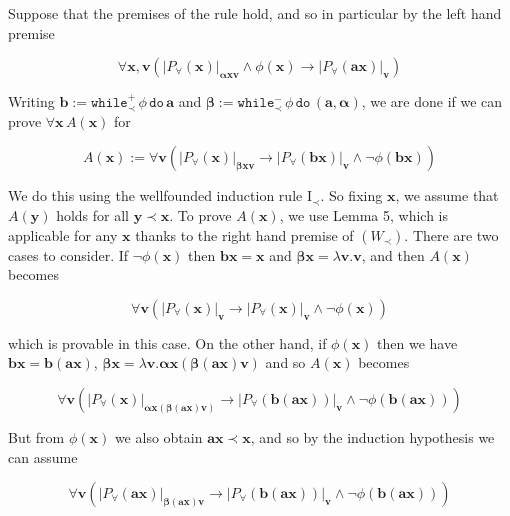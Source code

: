\documentclass[10pt,a4paper]{article}
\begin{document}
Suppose that the premises of the rule hold, and so in particular by the left hand premise\par
  
\par  \quad  \[\forall\bm{x},\bm{v}\left(|{P_{\forall}(\bm{x})}|_{\bm{\alpha}\bm{x}\bm{v}}\wedge\phi(\bm{x})\to|{P_{\forall}(\bm{a}\bm{x})}|_{\bm{v}}\right)\]\quad  \quad  
  
Writing $\bm{b}:=\mathtt{while}^{+}_{\prec}\,{\phi}\,\mathtt{do}\,{\bm{a}}$ and $\bm{\beta}:=\mathtt{while}^{-}_{\prec}\,{\phi}\,\mathtt{do}\,{(\bm{a},\bm{\alpha})}$, we are done if we can prove $\forall\bm{x}\,A(\bm{x})$ for\par
  
\par  \quad  \[A(\bm{x}):=\forall\bm{v}\left(|{P_{\forall}(\bm{x})}|_{\bm{\beta}\bm{x}\bm{v}}\to|{P_{\forall}(\bm{b}\bm{x})}|_{\bm{v}}\wedge\neg\phi(\bm{b}\bm{x})\right)\]\quad  \quad  
  
We do this using the wellfounded induction rule $\mathrm{I}_{\prec}$. So fixing $\bm{x}$, we assume that $A(\bm{y})$ holds for all $\bm{y}\prec\bm{x}$. To prove $A(\bm{x})$, we use Lemma 5, which is applicable for any $\bm{x}$ thanks to the right hand premise of $(W_{\prec})$. There are two cases to consider. If $\neg\phi(\bm{x})$ then $\bm{b}\bm{x}=\bm{x}$ and $\bm{\beta}\bm{x}=\lambda\bm{v}.\bm{v}$, and then $A(\bm{x})$ becomes\par
  
\par  \quad  \[\forall\bm{v}\left(|{P_{\forall}(\bm{x})}|_{\bm{v}}\to|{P_{\forall}(\bm{x})}|_{\bm{v}}\wedge\neg\phi(\bm{x})\right)\]\quad  \quad  
  
which is provable in this case. On the other hand, if $\phi(\bm{x})$ then we have $\bm{b}\bm{x}=\bm{b}(\bm{a}\bm{x})$, $\bm{\beta}\bm{x}=\lambda\bm{v}.\bm{\alpha}\bm{x}(\bm{\beta}(\bm{a}\bm{x})\bm{v})$ and so $A(\bm{x})$ becomes\par
  
\par  \quad  \[\forall\bm{v}\left(|{P_{\forall}(\bm{x})}|_{\bm{\alpha}\bm{x}(\bm{\beta}(\bm{a}\bm{x})\bm{v})}\to|{P_{\forall}(\bm{b}(\bm{a}\bm{x}))}|_{\bm{v}}\wedge\neg\phi(\bm{b}(\bm{a}\bm{x}))\right)\]\quad  \quad  
  
But from $\phi(\bm{x})$ we also obtain $\bm{a}\bm{x}\prec\bm{x}$, and so by the induction hypothesis we can assume\par
  
\par  \quad  \[\forall\bm{v}\left(|{P_{\forall}(\bm{a}\bm{x})}|_{\bm{\beta}(\bm{a}\bm{x})\bm{v}}\to|{P_{\forall}(\bm{b}(\bm{a}\bm{x}))}|_{\bm{v}}\wedge\neg\phi(\bm{b}(\bm{a}\bm{x}))\right)\]\quad  \quad  
  
\end{document}
